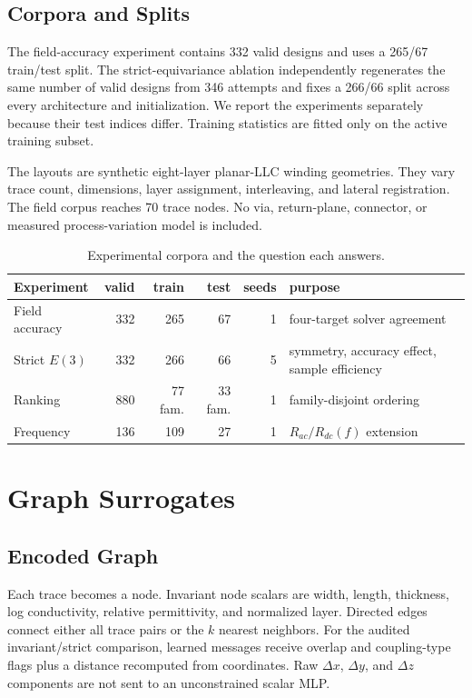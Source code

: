 \documentclass[letterpaper,twocolumn,9pt]{extarticle}
\newcommand{\Rac}{R_{ac}}
\newcommand{\Rdc}{R_{dc}}
\begin{document}
\subsection{Corpora and Splits}
The field-accuracy experiment contains 332 valid designs and uses a 265/67 train/test split. The strict-equivariance ablation independently regenerates the same number of valid designs from 346 attempts and fixes a 266/66 split across every architecture and initialization. We report the experiments separately because their test indices differ. Training statistics are fitted only on the active training subset.

The layouts are synthetic eight-layer planar-LLC winding geometries. They vary trace count, dimensions, layer assignment, interleaving, and lateral registration. The field corpus reaches 70 trace nodes. No via, return-plane, connector, or measured process-variation model is included.

\begin{table}[t]
\caption{Experimental corpora and the question each answers.}
\label{tab:corpora}
\centering
\footnotesize
\setlength{\tabcolsep}{3.5pt}
\begin{tabular}{p{}rrrrp{}}
\toprule
Experiment & valid & train & test & seeds & purpose\\
\midrule
Field accuracy & 332 & 265 & 67 & 1 & four-target solver agreement\\
Strict $E(3)$ & 332 & 266 & 66 & 5 & symmetry, accuracy effect, sample efficiency\\
Ranking & 880 & 77 fam. & 33 fam. & 1 & family-disjoint ordering\\
Frequency & 136 & 109 & 27 & 1 & $\Rac/\Rdc(f)$ extension\\
\bottomrule
\end{tabular}
\end{table}

\section{Graph Surrogates}
\subsection{Encoded Graph}
Each trace becomes a node. Invariant node scalars are width, length, thickness, log conductivity, relative permittivity, and normalized layer. Directed edges connect either all trace pairs or the $k$ nearest neighbors. For the audited invariant/strict comparison, learned messages receive overlap and coupling-type flags plus a distance recomputed from coordinates. Raw $\Delta x$, $\Delta y$, and $\Delta z$ components are not sent to an unconstrained scalar MLP.
\end{document}
